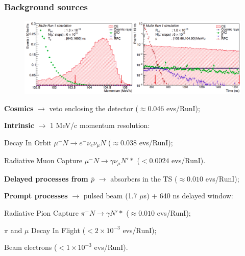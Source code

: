 \documentclass{beamer}
\begin{document}
\begin{frame}
    \frametitle{Background sources}
            \vspace{-3mm} 

         \begin{figure}[h]
            \centering
            \hspace*{-4ex}
            \includegraphics[width=1.\framewidth]{figures/png/Screenshot_20240225_102708.png}
        \end{figure}
        \setlength{\leftmargini}{-0.5em}
        \vspace{-3mm} 
      
    \begin{itemize}
      {\footnotesize
    \item \textbf{Cosmics} $\rightarrow$ veto enclosing the detector {\footnotesize($\approx$0.046 evs/RunI)};   
\item \textbf{Intrinsic} $\rightarrow$ 1 MeV/c momentum resolution:}
\begin{itemize}
    {\footnotesize\item Decay In Orbit $\mu^- N \rightarrow e^- \bar{\nu}_e\nu_\mu N $ {\footnotesize($\approx$0.038 evs/RunI)};
 \item Radiative Muon Capture $\mu^- N \rightarrow\gamma \nu_\mu N'* $ {\footnotesize($<0.0024$ evs/RunI)}.}
\end{itemize}
{\footnotesize \item \textbf{Delayed processes from $\bar{p}$} $\rightarrow$ absorbers in the TS {\footnotesize($\approx0.010$ evs/RunI)};
\item \textbf{Prompt processes} $\rightarrow$ pulsed beam (1.7 $\mu$s) + 640 ns delayed window:}
\begin{itemize}
    {\footnotesize  \item Radiative Pion Capture $\pi^- N \rightarrow \gamma N' *$ {\footnotesize($\approx0.010$ evs/RunI)};
 \item $\pi$ and $\mu$ Decay In Flight {\footnotesize($<2\times 10^{-3}$ evs/RunI)};
 \item Beam electrons {\footnotesize($<1\times 10^{-3}$ evs/RunI)}.}
     \end{itemize}
       
      \end{itemize}
\end{frame}
\end{document}
